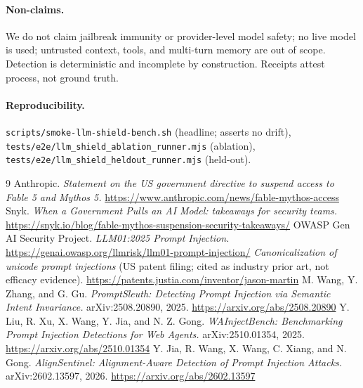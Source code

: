 \documentclass[11pt]{article}
\begin{document}
\paragraph{Non-claims.} We do not claim jailbreak immunity or provider-level model safety;
no live model is used; untrusted context, tools, and multi-turn memory are out of scope.
Detection is deterministic and incomplete by construction. Receipts attest process, not
ground truth.

\paragraph{Reproducibility.}
\texttt{scripts/smoke-llm-shield-bench.sh} (headline; asserts no drift),
\texttt{tests/e2e/llm\_shield\_ablation\_runner.mjs} (ablation),
\texttt{tests/e2e/llm\_shield\_heldout\_runner.mjs} (held-out).

\begin{thebibliography}{9}
 Anthropic. \emph{Statement on the US government directive to
suspend access to Fable 5 and Mythos 5.}
\url{https://www.anthropic.com/news/fable-mythos-access}
 Snyk. \emph{When a Government Pulls an AI Model: takeaways for security
teams.} \url{https://snyk.io/blog/fable-mythos-suspension-security-takeaways/}
 OWASP Gen AI Security Project. \emph{LLM01:2025 Prompt Injection.}
\url{https://genai.owasp.org/llmrisk/llm01-prompt-injection/}
 \emph{Canonicalization of unicode prompt injections} (US patent filing;
cited as industry prior art, not efficacy evidence).
\url{https://patents.justia.com/inventor/jason-martin}
 M. Wang, Y. Zhang, and G. Gu. \emph{PromptSleuth: Detecting Prompt
Injection via Semantic Intent Invariance.} arXiv:2508.20890, 2025.
\url{https://arxiv.org/abs/2508.20890}
 Y. Liu, R. Xu, X. Wang, Y. Jia, and N. Z. Gong.
\emph{WAInjectBench: Benchmarking Prompt Injection Detections for Web Agents.}
arXiv:2510.01354, 2025. \url{https://arxiv.org/abs/2510.01354}
 Y. Jia, R. Wang, X. Wang, C. Xiang, and N. Gong.
\emph{AlignSentinel: Alignment-Aware Detection of Prompt Injection Attacks.}
arXiv:2602.13597, 2026. \url{https://arxiv.org/abs/2602.13597}
\end{thebibliography}
\end{document}
